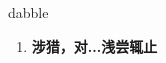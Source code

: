 
\begin{frame}
{\huge dabble}
\begin{center}
\begin{enumerate}\Large
  \item \textbf{涉猎，对...浅尝辄止}
\end{enumerate}
\end{center}
\end{frame}
